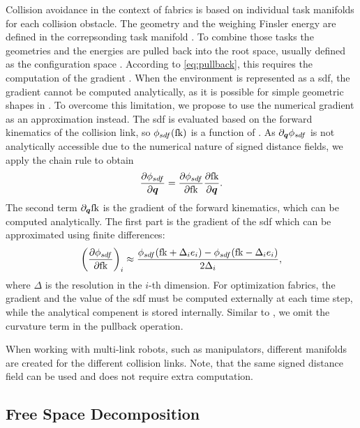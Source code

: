 Collision avoidance in the context of \ac{fabrics} is based on
individual task manifolds for each collision obstacle. The geometry and the 
weighing Finsler energy are defined in the correpsonding task manifold \X{}.
To combine those tasks the geometries and the energies are pulled back into the
root space, usually defined as the configuration space \Q{}. According 
to \cref{eq:pullback}, this requires the computation of the gradient \J{}.
When the environment is represented as a \ac{sdf}, the gradient cannot be
computed analytically, as it is possible for simple geometric shapes in
\cite{Ratliff2021,Spahn2023}. To overcome this limitation, we propose to
use the numerical gradient as an approximation instead.
The \ac{sdf} is evaluated based on the forward kinematics of the collision link,
so $\phi_{sdf}(\textrm{fk})$ is a function of \q{}.
As $\partial_{\bm{q}}\phi_{sdf}$ is not analytically accessible due to the numerical
nature of signed distance fields, we apply the chain rule to obtain
\[
  \frac{\partial\phi_{sdf}}{\partial\bm{q}} = \frac{\partial\phi_{sdf}}{\partial\textrm{fk}}\frac{\partial\textrm{fk}}{\partial\bm{q}}.
\]
The second term $\partial_{\bm{q}}\textrm{fk}$ is the gradient of the forward
kinematics, which can be computed analytically. The first part is the gradient
of the \ac{sdf} which can be
approximated using finite differences:
\[
  \left(\frac{\partial\phi_{sdf}}{\partial\textrm{fk}}\right)_i \approx 
  \frac{\phi_{sdf}(\textrm{fk} + \Delta_i e_i) - \phi_{sdf}(\textrm{fk} - \Delta_i e_i)}{2 \Delta_i},
\]
where $\Delta$ is the resolution in the $i$-th dimension. For optimization
\ac{fabrics}, the gradient and the value of the \ac{sdf} must be computed externally
at each time step, while the analytical compenent is stored internally. Similar
to \cite{Ratliff2021}, we omit the curvature term \Jdot{} in the pullback
operation.

When working with multi-link robots, such as manipulators, different manifolds
are created for the different collision links. Note, that the same signed
distance field can be used and does not require extra computation.

\subsection{Free Space Decomposition}
\label{sub:Free Space Decomposition}


